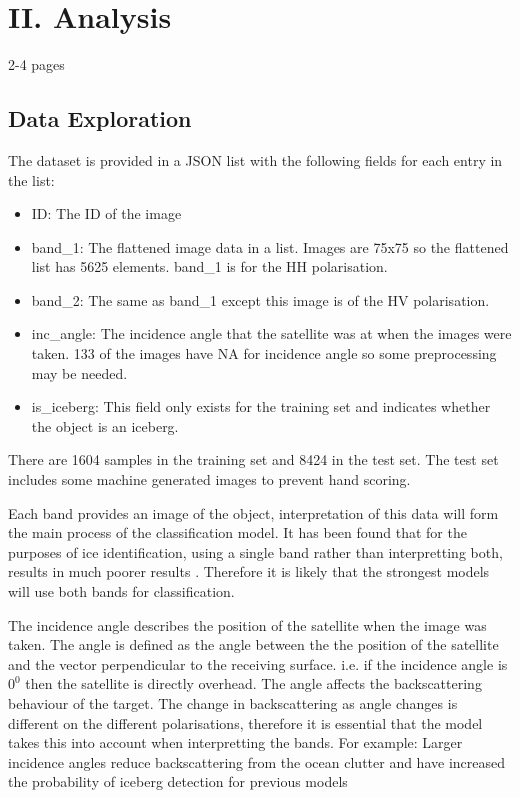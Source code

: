 \documentclass{article}
\begin{document}
\section{II. Analysis}
2-4 pages
\subsection{Data Exploration}
The dataset is provided in a JSON list with the following fields for each entry in the list:
\begin{itemize}
\item ID: The ID of the image
\item band\_1: The flattened image data in a list. Images are 75x75 so the flattened list has 5625 elements. band\_1 is for the HH polarisation.
\item band\_2: The same as band\_1 except this image is of the HV polarisation.
\item inc\_angle: The incidence angle that the satellite was at when the images were taken. 133 of the images have NA for incidence angle so some preprocessing may be needed.
\item is\_iceberg: This field only exists for the training set and indicates whether the object is an iceberg.
\end{itemize}
There are 1604 samples in the training set and 8424 in the test set. The test set includes some machine generated images to prevent hand scoring. 

Each band provides an image of the object, interpretation of this data will form the main process of the classification model. It has been found that for the purposes of ice identification, using a single band rather than interpretting both, results in much poorer results \cite{radarsat-mode-selection,yu}. Therefore it is likely that the strongest models will use both bands for classification.

The incidence angle describes the position of the satellite when the image was taken. The angle is defined as the angle between the the position of the satellite and the vector perpendicular to the receiving surface. i.e. if the incidence angle is $0^0$ then the satellite is directly overhead. The angle affects the backscattering behaviour of the target. The change in backscattering as angle changes is different on the different polarisations, therefore it is essential that the model takes this into account when interpretting the bands. For example: Larger incidence angles reduce backscattering from the ocean clutter and have increased the probability of iceberg detection for previous models \cite{radarsat-mode-selection}
\end{document}

